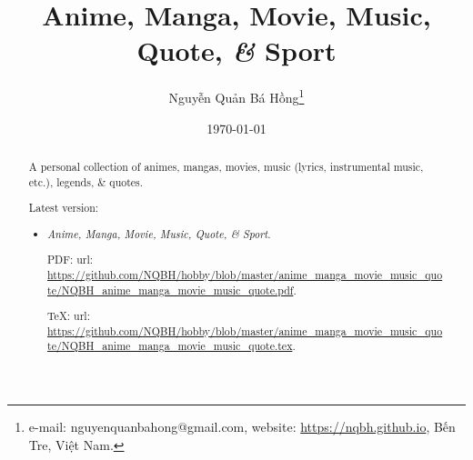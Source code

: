 \documentclass{article}
\title{Anime, Manga, Movie, Music, Quote, {\it\&} Sport}
\author{Nguyễn Quản Bá Hồng\footnote{e-mail: {\sf nguyenquanbahong@gmail.com}, website: \url{https://nqbh.github.io}, Bến Tre, Việt Nam.}}
\date{\today}
\begin{document}
\maketitle
\begin{abstract}
	A personal collection of animes, mangas, movies, music (lyrics, instrumental music, etc.), legends, \& quotes.
	
	Latest version:
	\begin{itemize}
		\item {\it Anime, Manga, Movie, Music, Quote, \& Sport}.
		
		PDF: {\sc url}: \url{https://github.com/NQBH/hobby/blob/master/anime_manga_movie_music_quote/NQBH_anime_manga_movie_music_quote.pdf}.
		
		\TeX: {\sc url}: \url{https://github.com/NQBH/hobby/blob/master/anime_manga_movie_music_quote/NQBH_anime_manga_movie_music_quote.tex}.
	\end{itemize}
\end{abstract}
\setcounter{secnumdepth}{4}
\setcounter{tocdepth}{4}
\tableofcontents

\end{document}
